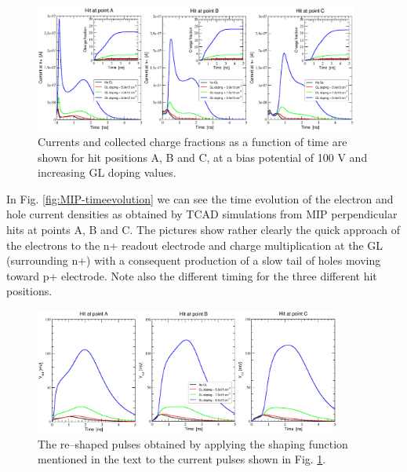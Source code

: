 \documentclass[aps,pt14,superscriptaddress,floatfix,nofootinbib]{revtex4}
\begin{document}
\begin{figure}[hbtp]
\begin{center}
\includegraphics[width=0.95\textwidth,keepaspectratio]{figures1/MIP-ABC-CCE-new.pdf}
\caption{Currents and collected charge fractions as a function of time are shown for hit positions A, B and C, at a bias potential of 100 V and increasing GL doping values.\label{fig:MIP-ABC-CCE-new}}  
\end{center}
\end{figure}

In Fig. \ref{fig:MIP-timeevolution} we can see the time evolution of the electron and hole current densities as obtained by TCAD simulations from MIP perpendicular hits at points A, B and C. The pictures show rather clearly the quick approach of the electrons to the n+ readout electrode and charge multiplication at the GL (surrounding n+) with a consequent production of a slow tail of holes moving toward p+ electrode. Note also the different timing for the three different hit positions.    
 
\begin{figure}[hbtp]
\begin{center}
\includegraphics[width=0.90\textwidth,keepaspectratio]{figures1/Shaped_pulses_new.pdf}
\caption{The re--shaped pulses obtained by applying the shaping function mentioned in the text to the current pulses shown in Fig. \ref{fig:MIP-ABC-CCE-new}.\label{fig:Shaped}}
\end{center}
\end{figure}
\end{document}
